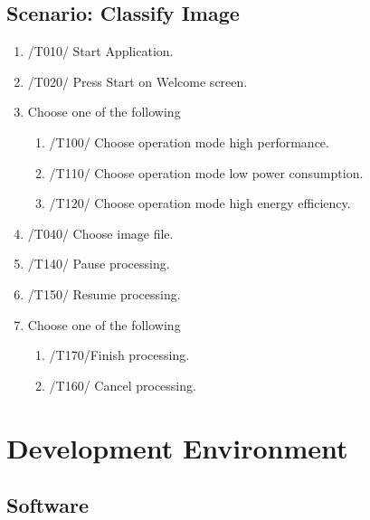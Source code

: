 \documentclass[parskip=full]{scrartcl}
\begin{document}
\pagebreak



\subsection {Scenario: Classify Image}

\begin{enumerate}
	\item /T010/ Start Application.
	\item /T020/ Press Start on Welcome screen.
	\item Choose one of the following
	\begin{enumerate}
		\item /T100/ Choose operation mode high performance.
		\item /T110/ Choose operation mode low power consumption.
		\item /T120/ Choose operation mode high energy efficiency.
	\end{enumerate}
	\item /T040/ Choose image file.
	\item /T140/ Pause processing.
	\item /T150/ Resume processing.
	\item Choose one of the following
	\begin{enumerate}
		\item /T170/Finish processing.
		\item /T160/ Cancel processing.
	\end{enumerate}
\end{enumerate}

\pagebreak



\section{Development Environment}

\subsection {Software}
\end{document}
